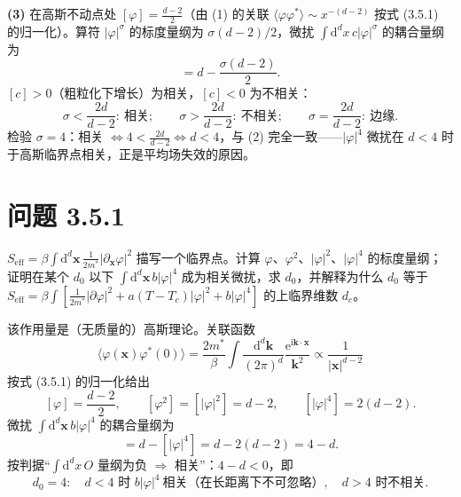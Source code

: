 \textbf{(3)} 在高斯不动点处 $[\varphi]=\frac{d-2}{2}$（由 (1) 的关联 $\langle\varphi\varphi^{*}\rangle\sim x^{-(d-2)}$ 按式 (3.5.1) 的归一化）。算符 $|\varphi|^{\sigma}$ 的标度量纲为 $\sigma(d-2)/2$，微扰 $\int\mathrm{d}^dx\,c|\varphi|^{\sigma}$ 的耦合量纲为
\begin{equation*}
[c]=d-\frac{\sigma(d-2)}{2} .
\end{equation*}
$[c]>0$（粗粒化下增长）为相关，$[c]<0$ 为不相关：
\begin{equation*}
\boxed{\;\sigma<\frac{2d}{d-2}:\ \text{相关};\qquad
\sigma>\frac{2d}{d-2}:\ \text{不相关};\qquad
\sigma=\frac{2d}{d-2}:\ \text{边缘}.\;}
\end{equation*}
检验 $\sigma=4$：相关 $\Leftrightarrow4<\frac{2d}{d-2}\Leftrightarrow d<4$，与 (2) 完全一致——$|\varphi|^{4}$ 微扰在 $d<4$ 时于高斯临界点相关，正是平均场失效的原因。

\section*{问题 3.5.1}
\begin{problem}
$S_{\mathrm{eff}}=\beta\int\mathrm{d}^d\pmb{x}\,\frac{1}{2m^{*}}|\partial_{\pmb{x}}\varphi|^{2}$ 描写一个临界点。计算 $\varphi$、$\varphi^{2}$、$|\varphi|^{2}$、$|\varphi|^{4}$ 的标度量纲；证明在某个 $d_0$ 以下 $\int\mathrm{d}^d\pmb{x}\,b|\varphi|^{4}$ 成为相关微扰，求 $d_0$，并解释为什么 $d_0$ 等于 $S_{\mathrm{eff}}=\beta\int[\frac{1}{2m^{*}}|\partial\varphi|^{2}+a(T-T_c)|\varphi|^{2}+b|\varphi|^{4}]$ 的上临界维数 $d_c$。
\end{problem}
\solution

该作用量是（无质量的）高斯理论。关联函数
\begin{equation*}
\langle\varphi(\pmb{x})\varphi^{*}(0)\rangle
=\frac{2m^{*}}{\beta}\int\frac{\mathrm{d}^d\pmb{k}}{(2\pi)^{d}}\frac{\mathrm{e}^{\mathrm{i}\pmb{k}\cdot\pmb{x}}}{\pmb{k}^{2}}
\propto\frac{1}{|\pmb{x}|^{d-2}}
\end{equation*}
按式 (3.5.1) 的归一化给出
\begin{equation*}
\boxed{\;[\varphi]=\frac{d-2}{2},\qquad
[\varphi^{2}]=[|\varphi|^{2}]=d-2,\qquad
[|\varphi|^{4}]=2(d-2).\;}
\end{equation*}
微扰 $\int\mathrm{d}^d\pmb{x}\,b|\varphi|^{4}$ 的耦合量纲为
\begin{equation*}
[b]=d-[|\varphi|^{4}]=d-2(d-2)=4-d .
\end{equation*}
按判据“$\int\mathrm{d}^dx\,O$ 量纲为负 $\Rightarrow$ 相关”：$4-d<0$，即
\begin{equation*}
\boxed{\;d_0=4:\quad d<4 \text{ 时 } b|\varphi|^{4}\ \text{相关（在长距离下不可忽略）},\quad
d>4 \text{ 时不相关}.\;}
\end{equation*}


